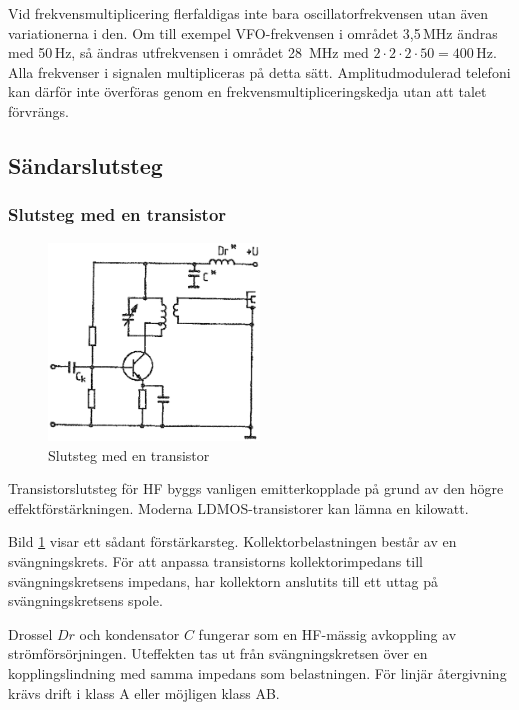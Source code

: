 Vid frekvensmultiplicering flerfaldigas inte bara oscillatorfrekvensen utan
även variationerna i den.
Om till exempel VFO-frekvensen i området 3,5\,MHz ändras med 50\,Hz, så ändras
utfrekvensen i området 28~MHz med \(2 \cdot 2 \cdot 2 \cdot 50 = 400\)\,Hz.
Alla frekvenser i signalen multipliceras på detta sätt.
Amplitudmodulerad telefoni kan därför inte överföras genom en
frekvensmultipliceringskedja utan att talet förvrängs.

\subsection{Sändarslutsteg}

\subsubsection{Slutsteg med en transistor}

\begin{figure}
\includegraphics[width=0.5\textwidth]{images/cropped_pdfs/bild_2_3-48.pdf}
\caption{Slutsteg med en transistor}
\label{fig:BildII3-48}
\end{figure}

Transistorslutsteg för HF byggs vanligen emitterkopplade på grund av den
högre effektförstärkningen.
Moderna LDMOS-transistorer kan lämna en kilowatt.

Bild \ref{fig:BildII3-48} visar ett sådant förstärkarsteg.
Kollektorbelastningen består av en svängningskrets.
För att anpassa transistorns kollektorimpedans till svängningskretsens
impedans, har kollektorn anslutits till ett uttag på svängningskretsens spole.

Drossel \(Dr\) och kondensator \(C\) fungerar som en HF-mässig
avkoppling av strömförsörjningen.
Uteffekten tas ut från svängningskretsen över en kopplingslindning med samma
impedans som belastningen.
För linjär återgivning krävs drift i klass A eller möjligen klass AB.

